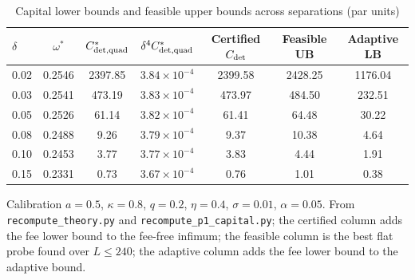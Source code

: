 \begin{table}[t]\centering\small
\begin{threeparttable}
\caption{Capital lower bounds and feasible upper bounds across separations (par units)}\label{p1:tab:capbounds}
\begin{tabular}{lcccccc}
\toprule
$\delta$ & $\omega^*$ & $C^*_{\rm det,quad}$ & $\delta^4C^*_{\rm det,quad}$ & Certified $C_{\rm det}$ & Feasible UB & Adaptive LB\\
\midrule
0.02 & 0.2546 & 2397.85 & $3.84\times10^{-4}$ & 2399.58 & 2428.25 & 1176.04\\
0.03 & 0.2541 & 473.19 & $3.83\times10^{-4}$ & 473.97 & 484.50 & 232.51\\
0.05 & 0.2526 & 61.14 & $3.82\times10^{-4}$ & 61.41 & 64.48 & 30.22\\
0.08 & 0.2488 & 9.26 & $3.79\times10^{-4}$ & 9.37 & 10.38 & 4.64\\
0.10 & 0.2453 & 3.77 & $3.77\times10^{-4}$ & 3.83 & 4.44 & 1.91\\
0.15 & 0.2331 & 0.73 & $3.67\times10^{-4}$ & 0.76 & 1.01 & 0.38\\
\bottomrule
\end{tabular}
\begin{tablenotes}\footnotesize\item Calibration $a=0.5$, $\kappa=0.8$, $q=0.2$, $\eta=0.4$, $\sigma=0.01$, $\alpha=0.05$. From \texttt{recompute\_theory.py} and \texttt{recompute\_p1\_capital.py}; the certified column adds the fee lower bound to the fee-free infimum; the feasible column is the best flat probe found over $L\le240$; the adaptive column adds the fee lower bound to the adaptive bound.\end{tablenotes}
\end{threeparttable}
\end{table}

